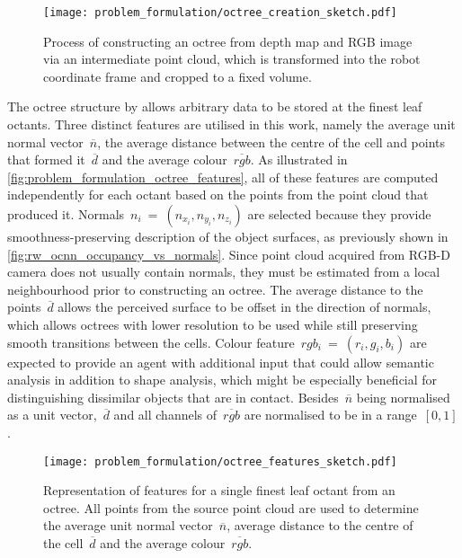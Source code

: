 \begin{figure}[ht]
    \centering
    \texttt{[image: problem\_formulation/octree\_creation\_sketch.pdf]}
    \caption{Process of constructing an octree from depth map and RGB image via an intermediate point cloud, which is transformed into the robot coordinate frame and cropped to a fixed volume.}
    \label{fig:problem_formulation_octree_creation_sketch}
\end{figure}

The octree structure by \citet{wang_o-cnn_2017} allows arbitrary data to be stored at the finest leaf octants. Three distinct features are utilised in this work, namely the average unit normal vector~\(\overline{n}\), the average distance between the centre of the cell and points that formed it~\(\overline{d}\) and the average colour~\(\overline{rgb}\). As illustrated in \autoref{fig:problem_formulation_octree_features}, all of these features are computed independently for each octant based on the points from the point cloud that produced it. Normals~\(n_{i}~{=}~(n_{x_{i}},n_{y_{i}},n_{z_{i}})\) are selected because they provide smoothness-preserving description of the object surfaces, as previously shown in \autoref{fig:rw_ocnn_occupancy_vs_normals}. Since point cloud acquired from RGB-D camera does not usually contain normals, they must be estimated from a local neighbourhood prior to constructing an octree. The average distance to the points~\(\overline{d}\) allows the perceived surface to be offset in the direction of normals, which allows octrees with lower resolution to be used while still preserving smooth transitions between the cells. Colour feature~\(rgb_{i}~{=}~(r_{i},g_{i},b_{i})\) are expected to provide an agent with additional input that could allow semantic analysis in addition to shape analysis, which might be especially beneficial for distinguishing dissimilar objects that are in contact. Besides~\(\overline{n}\) being normalised as a unit vector,~\(\overline{d}\) and all channels of~\(\overline{rgb}\) are normalised to be in a range~\([0,1]\).

\begin{figure}[ht]
    \centering
    \texttt{[image: problem\_formulation/octree\_features\_sketch.pdf]}
    \caption{Representation of features for a single finest leaf octant from an octree. All points from the source point cloud are used to determine the average unit normal vector~\(\overline{n}\), average distance to the centre of the cell~\(\overline{d}\) and the average colour~\(\overline{rgb}\).}
    \label{fig:problem_formulation_octree_features}
\end{figure}



